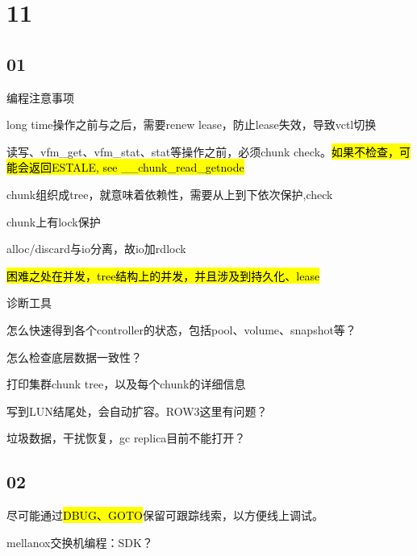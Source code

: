 \section{11}

\subsection{01}

编程注意事项
\begin{enumbox}
\item long time操作之前与之后，需要renew lease，防止lease失效，导致vctl切换
\item 读写、vfm\_get、vfm\_stat、stat等操作之前，必须chunk check。\hl{如果不检查，可能会返回ESTALE, see \_\_chunk\_read\_getnode}
\item chunk组织成tree，就意味着依赖性，需要从上到下依次保护,check
\item chunk上有lock保护
\item alloc/discard与io分离，故io加rdlock
\item \hl{困难之处在并发，tree结构上的并发，并且涉及到持久化、lease}
\end{enumbox}

诊断工具
\begin{enumbox}
\item 怎么快速得到各个controller的状态，包括pool、volume、snapshot等？
\item 怎么检查底层数据一致性？
\item 打印集群chunk tree，以及每个chunk的详细信息
\end{enumbox}

写到LUN结尾处，会自动扩容。ROW3这里有问题？

垃圾数据，干扰恢复，gc replica目前不能打开？

\subsection{02}

尽可能通过\hl{DBUG、GOTO}保留可跟踪线索，以方便线上调试。

mellanox交换机编程：SDK？

